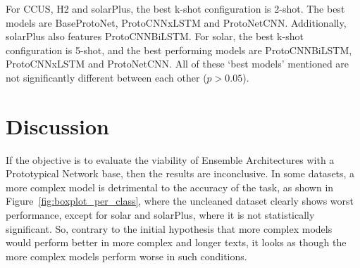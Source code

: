 \documentclass[11pt]{article}
\begin{document}
For CCUS, H2 and solarPlus, the best k-shot configuration 
is 2-shot. The best models are BaseProtoNet, ProtoCNNxLSTM and ProtoNetCNN. Additionally, solarPlus also features ProtoCNNBiLSTM.
For solar, the best k-shot configuration is 5-shot, and the best performing models are ProtoCNNBiLSTM, ProtoCNNxLSTM and ProtoNetCNN.
All of these `best models' mentioned are not significantly different between each other (\( p>0.05\)).

\section{Discussion}

If the objective is to evaluate
the viability of Ensemble Architectures with a Prototypical Network base, then the results are inconclusive. In some datasets, a more complex model is detrimental
to the accuracy of the task, as shown in Figure~\ref{fig:boxplot_per_class}, where the uncleaned dataset clearly shows worst performance, except for solar and solarPlus, where it is not statistically significant.
So, contrary to the initial hypothesis that more complex models would perform better in more complex and longer texts, it looks as though the more complex models perform worse in such conditions.
\end{document}
